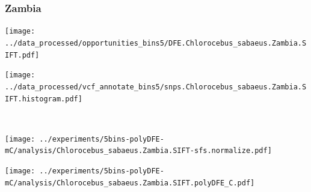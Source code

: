 \subsubsection{Zambia}

\begin{minipage}{0.49\linewidth}
    \texttt{[image: ../data\_processed/opportunities\_bins5/DFE.Chlorocebus\_sabaeus.Zambia.SIFT.pdf]}
\end{minipage}
\begin{minipage}{0.49\linewidth}
    \texttt{[image: ../data\_processed/vcf\_annotate\_bins5/snps.Chlorocebus\_sabaeus.Zambia.SIFT.histogram.pdf]}
\end{minipage}
\\
\begin{minipage}{0.49\linewidth}
    \texttt{[image: ../experiments/5bins-polyDFE-mC/analysis/Chlorocebus\_sabaeus.Zambia.SIFT-sfs.normalize.pdf]}
\end{minipage}
\begin{minipage}{0.4\linewidth}
    \texttt{[image: ../experiments/5bins-polyDFE-mC/analysis/Chlorocebus\_sabaeus.Zambia.SIFT.polyDFE\_C.pdf]}
\end{minipage}

